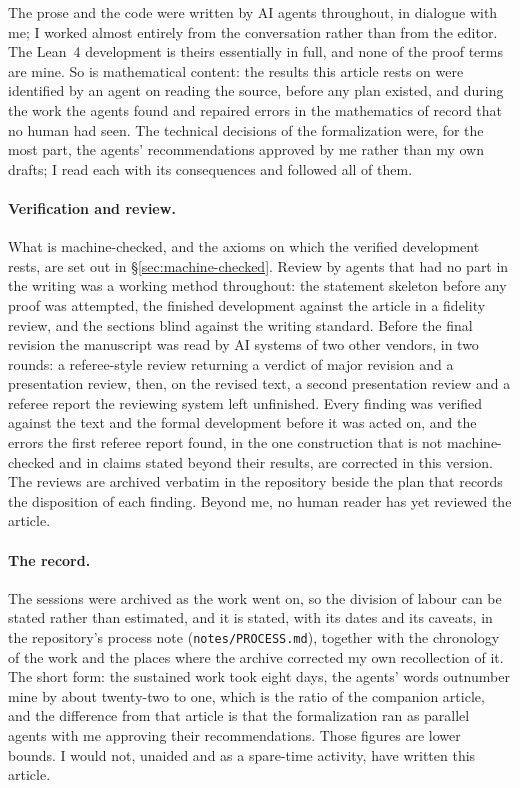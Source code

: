 The prose and the code were written by AI agents throughout, in dialogue with me; I worked
almost entirely from the conversation rather than from the editor. The Lean~4 development is
theirs essentially in full, and none of the proof terms are mine. So is mathematical content:
the results this article rests on were identified by an agent on reading the source, before
any plan existed, and during the work the agents found and repaired errors in the mathematics
of record that no human had seen. The technical decisions of the formalization were, for the
most part, the agents' recommendations approved by me rather than my own drafts; I read each
with its consequences and followed all of them.

\paragraph{Verification and review.} What is machine-checked, and the axioms on which the
verified development rests, are set out in \S\ref{sec:machine-checked}. Review by agents that
had no part in the writing was a working method throughout: the statement skeleton before any
proof was attempted, the finished development against the article in a fidelity review, and
the sections blind against the writing standard. Before the final revision the manuscript was
read by AI systems of two other vendors, in two rounds: a referee-style review returning a
verdict of major revision and a presentation review, then, on the revised text, a second
presentation review and a referee report the reviewing system left unfinished. Every
finding was verified against the text and the formal development before it was acted on,
and the errors the first referee report found, in the one construction that is not
machine-checked and in claims stated beyond their results, are corrected in this version.
The reviews are archived verbatim in the repository beside the plan that records the
disposition of each finding. Beyond me, no human reader has
yet reviewed the article.

\paragraph{The record.} The sessions were archived as the work went on, so the division of
labour can be stated rather than estimated, and it is stated, with its dates and its caveats,
in the repository's process note (\texttt{notes/PROCESS.md}), together with the chronology of
the work and the places where the archive corrected my own recollection of it. The short
form: the sustained work took eight days, the agents' words outnumber mine by about
twenty-two to one, which is the ratio of the companion article, and the difference from that
article is that the formalization ran as parallel agents with me approving their
recommendations. Those figures are lower bounds. I would not, unaided and as a spare-time
activity, have written this article.

